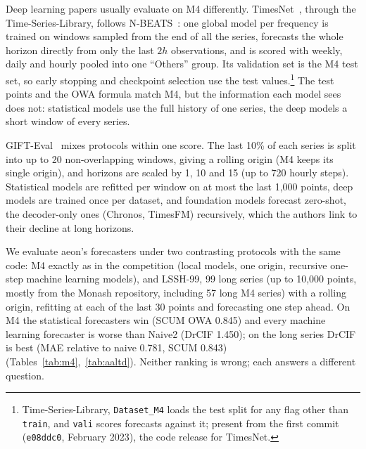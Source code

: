 Deep learning papers usually evaluate on M4 differently.
TimesNet~\citep{wu2023timesnet}, through the Time-Series-Library, follows
N-BEATS~\citep{oreshkin2020nbeats}: one global model per frequency is trained
on windows sampled from the end of all the series, forecasts the whole horizon
directly from only the last $2h$ observations, and is scored with weekly,
daily and hourly pooled into one ``Others'' group. Its validation set is the
M4 test set, so early stopping and checkpoint selection use the test
values.\footnote{Time-Series-Library, \texttt{Dataset\_M4} loads the test split
for any flag other than \texttt{train}, and \texttt{vali} scores forecasts
against it; present from the first commit (\texttt{e08ddc0}, February 2023),
the code release for TimesNet.} The test points and the
OWA formula match M4, but the information each model sees does not:
statistical models use the full history of one series, the deep models a short
window of every series.

GIFT-Eval~\citep{aksu2024gifteval} mixes protocols within one score. The last
10\% of each series is split into up to 20 non-overlapping windows, giving a
rolling origin (M4 keeps its single origin), and horizons are scaled by 1, 10
and 15 (up to 720 hourly steps). Statistical models are refitted per window on
at most the last 1{,}000 points, deep models are trained once per dataset, and
foundation models forecast zero-shot, the decoder-only ones (Chronos, TimesFM)
recursively, which the authors link to their decline at long horizons.

We evaluate aeon's forecasters under two contrasting protocols with the same
code: M4 exactly as in the competition (local models, one origin, recursive
one-step machine learning models), and LSSH-99, 99 long series (up to 10{,}000 points,
mostly from the Monash repository, including 57 long M4 series) with a rolling
origin, refitting at each of the last 30 points and forecasting one step ahead.
On M4 the statistical forecasters win (SCUM OWA 0.845) and every machine
learning forecaster is worse than Naive2 (DrCIF 1.450); on the long series
DrCIF is best (MAE relative to naive 0.781, SCUM 0.843)
(Tables~\ref{tab:m4},~\ref{tab:aaltd}). Neither ranking is wrong; each answers
a different question.
